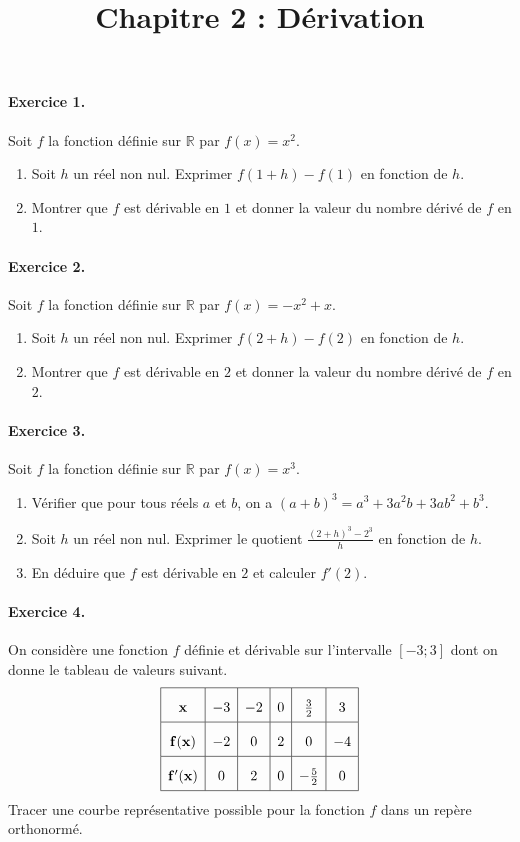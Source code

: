 \documentclass[11pt]{article}
\title{Chapitre 2 : Dérivation}
\date{}
\author{}
\begin{document}

\newcommand{\Cf}{\mathscr{C}_f}

\paragraph{Exercice 1.} Soit $f$ la fonction définie sur $\mathbb{R}$ par
$f(x)=x^2$.
\begin{enumerate}
  \item Soit $h$ un réel non nul. Exprimer $f(1+h)-f(1)$ en fonction de $h$.
  \item Montrer que $f$ est dérivable en $1$ et donner la valeur du nombre
    dérivé de $f$ en $1$.
\end{enumerate}

\paragraph{Exercice 2.} Soit $f$ la fonction définie sur $\mathbb{R}$ par
$f(x)=-x^2+x$.
\begin{enumerate}
  \item Soit $h$ un réel non nul. Exprimer $f(2+h)-f(2)$ en fonction de $h$.
  \item Montrer que $f$ est dérivable en $2$ et donner la valeur du nombre
    dérivé de $f$ en $2$.
\end{enumerate}

\paragraph{Exercice 3.} Soit $f$ la fonction définie sur $\mathbb{R}$ par
$f(x)=x^3$.
\begin{enumerate}
  \item Vérifier que pour tous réels $a$ et $b$, on a
    $(a+b)^3=a^3+3a^2b+3ab^2+b^3$.
  \item Soit $h$ un réel non nul. Exprimer le quotient
    $\frac{(2+h)^3-2^3}{h}$ en fonction de $h$.
  \item En déduire que $f$ est dérivable en $2$ et calculer $f'(2)$.
\end{enumerate}

\paragraph{Exercice 4.} On considère une fonction $f$ définie et dérivable sur
l'intervalle $\left[ -3; 3 \right]$ dont on donne le tableau de valeurs suivant.
\[
  \def\arraystretch{2}
  \begin{array}{|c|c|c|c|c|c|}
    \hline
    \mathbf{x} & -3 & -2 & 0 & \frac{3}{2} & 3 \\
    \hline
    \mathbf{f(x)} & -2 & 0 & 2 & 0 & -4 \\
    \hline
    \mathbf{f'(x)} & 0 & 2 & 0 & -\frac{5}{2} & 0 \\
    \hline
  \end{array}
\]
Tracer une courbe représentative possible pour la fonction $f$ dans un repère
orthonormé.
\end{document}
